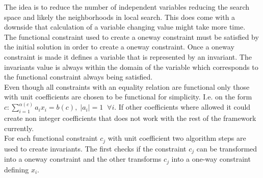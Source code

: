 The idea is to reduce the number of independent variables reducing the search space and likely the neighborhoods in 
local search. This does come with a downside that calculation of a variable changing value might take more time. \\ 
The functional constraint used to create a oneway constraint must be satisfied by the initial solution in order to 
create a oneway constraint. Once a oneway constraint is made it defines a variable that is represented by an invariant. 
The invariants value is always within the domain of the variable which corresponds to the functional constraint always 
being satisfied. \\
Even though all  constraints with an equality relation are functional only those with unit 
coefficients are chosen to be functional for simplicity. I.e. on the form $c: \sum\limits_{i=1}^{\alpha(c)} a_i 
x_i = b(c), \; |a_i|= 1 \; \; \forall i $. If other coefficients where allowed it could create non integer coefficients 
that does not work with the rest of the framework currently.  \\ 
For each functional  constraint $c_j$ with unit coefficient two algorithm steps are used to create 
invariants. The first checks if the constraint $c_j$ can be transformed into a oneway constraint and the other 
transforms $c_j$ into a one-way constraint defining $x_i$. \\ 
\IncMargin{1em}
